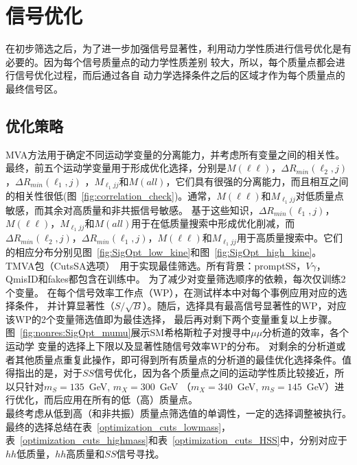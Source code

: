 \section{信号优化}\label{sec:signal_optimization}
在初步筛选之后，为了进一步加强信号显著性，利用动力学性质进行信号优化是有必要的。因为每个信号质量点的动力学性质差别
较大，所以，每个质量点都会进行信号优化过程，而后通过各自
动力学选择条件之后的区域才作为每个质量点的最终信号区。

\subsection{优化策略}
MVA方法用于确定不同运动学变量的分离能力，并考虑所有变量之间的相关性。最终，前五个运动学变量用于形成优化选择，分别是$M(\ell\ell)$，$\Delta R_{min}(\ell_{2}, j)$，$\Delta R_{min}(\ell_{1}, j)$ ，$ M_{\ell_{1} jj}$和$M(all)$，它们具有很强的分离能力，而且相互之间的相关性很低(图~\ref{fig:correlation_check})。通常，$M(\ell\ell)$和$ M_{\ell_{1} jj} $对低质量点敏感，而其余对高质量和非共振信号敏感。
基于这些知识，$\Delta R_{min}(\ell_{1}, j)$，$M(\ell\ell)$，$ M_{\ell_{1}jj}$和$M(all)$用于在低质量搜索中形成优化削减，而$\Delta R_{min}(\ell_{2}, j)$，$\Delta R_{min}(\ell_{1}, j)$，$M(\ell\ell)$和$M_{\ell_{1}jj}$用于高质量搜索中。它们的相应分布分别见图~\ref{fig:SigOpt_low_kine}和图~\ref{fig:SigOpt_high_kine}。\\
TMVA包（CutsSA选项）~\cite{Hocker:2007ht}用于实现最佳筛选。所有背景：promptSS，$V\gamma$，QmisID和fakes都包含在训练中。
为了减少对变量筛选顺序的依赖，每次仅训练2个变量。
在每个信号效率工作点（WP），在测试样本中对每个事例应用对应的选择条件，
并计算显著性（$S/\sqrt{B}$）。随后，选择具有最高信号显著性的WP，对应该WP的2个变量筛选值即为最佳选择，
最后再对剩下两个变量重复以上步骤。图~\ref{fig:nonres:SigOpt_mumu}展示SM希格斯粒子对搜寻中$\mu\mu$分析道的效率，各个运动学
变量的选择上下限以及显著性随信号效率WP的分布。
对剩余的分析道或者其他质量点重复此操作，即可得到所有质量点的分析道的最佳优化选择条件。值得指出的是，对于$SS$信号优化，因为各个质量点之间的运动学性质比较接近，所以只针对$m_S=135$~GeV, $m_X=300$~GeV （$m_X=340$~GeV, $m_S=145$~GeV）进行优化，而后应用在所有的低（高）质量点。 \\
最终考虑从低到高（和非共振）质量点筛选值的单调性，一定的选择调整被执行。最终的选择总结在表~\ref{optimization_cuts_lowmass}，表~\ref {optimization_cuts_highmass}和表~\ref{optimization_cuts_HSS}中，分别对应于$hh$低质量，$hh$高质量和$SS$信号寻找。


